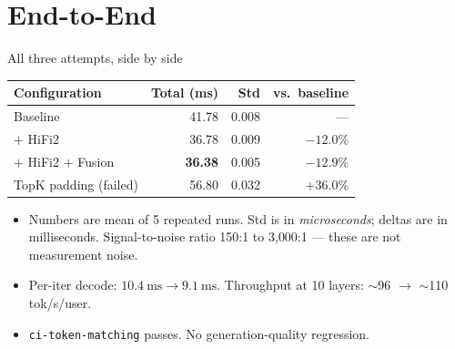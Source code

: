 \documentclass[aspectratio=169,10pt]{beamer}
\begin{document}
\section{End-to-End}

\begin{frame}{All three attempts, side by side}
  \centering
  \small
  \begin{tabular}{lrrr}
    \toprule
    Configuration                       & Total (ms) & Std & vs.\ baseline \\
    \midrule
    Baseline                            & 41.78 & 0.008 & --- \\
    $+$ HiFi2                           & 36.78 & 0.009 & ${-}12.0\%$ \\
    $+$ HiFi2 $+$ Fusion                & \textbf{36.38} & 0.005 & \textbf{${-}12.9\%$} \\
    \midrule
    TopK padding (failed)               & \alert{56.80} & 0.032 & \alert{$+36.0\%$} \\
    \bottomrule
  \end{tabular}
  \vfill
  \begin{itemize}
    \item Numbers are mean of 5 repeated runs. Std is in
          \emph{microseconds}; deltas are in milliseconds. Signal-to-noise
          ratio 150:1 to 3{,}000:1 — these are not measurement noise.
    \item Per-iter decode: $10.4~\text{ms} \to 9.1~\text{ms}$. Throughput at
          10 layers: $\sim$96 $\to$ $\sim$110 tok/s/user.
    \item \texttt{ci-token-matching} passes. No generation-quality regression.
  \end{itemize}
\end{frame}
\end{document}
